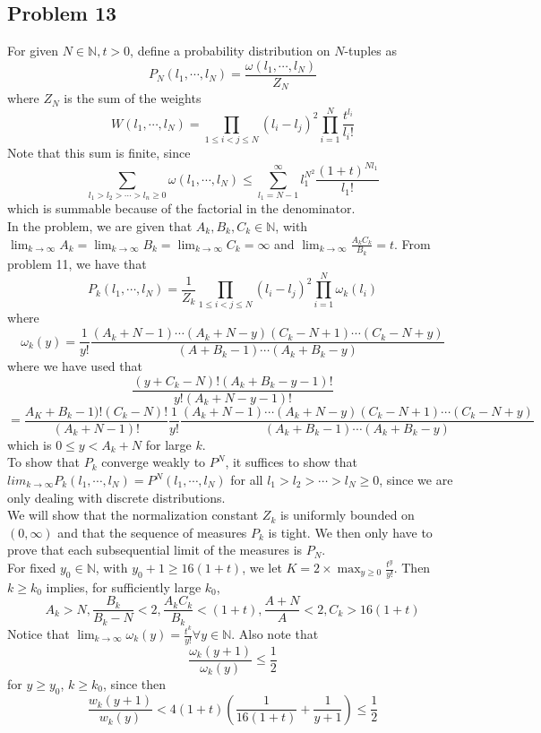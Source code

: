 \documentclass[12pt]{article}
\begin{document}
	
	\subsection*{Problem 13}

For given $N \in \mathbb{N}, t > 0$, define a probability distribution on $N$-tuples as
$$P_N(l_1, \cdots, l_N) = \frac{\omega(l_1, \cdots, l_N)}{Z_N}$$
where $Z_N$ is the sum of the weights
$$W(l_1, \cdots, l_N) = \prod_{1 \leq i < j \leq N} (l_i - l_j)^2 \prod_{i = 1}^N \frac{t^{l_i}}{l_i !}$$
Note that this sum is finite, since
$$\sum_{l_1 > l_2 > \cdots > l_n \geq 0} \omega(l_1, \cdots, l_N) \leq \sum_{l_1 = N-1}^\infty l_1^{N^2} \frac{(1 + t)^{Nl_1}}{l_1!}$$
which is summable because of the factorial in the denominator.\\

In the problem, we are given that $A_k, B_k, C_k \in \mathbb{N}$, with $\lim_{k \rightarrow \infty} A_k = \lim_{k \rightarrow \infty} B_k = \lim_{k \rightarrow \infty} C_k = \infty$ and $\lim_{k \rightarrow \infty} \frac{A_k C_k}{B_k} = t$. From problem 11, we have that
$$P_k(l_1, \cdots, l_N) = \frac{1}{Z_k} \prod_{1 \leq i < j \leq N} (l_i - l_j)^2 \prod_{i = 1}^N \omega_k(l_i)$$
where
$$\omega_k(y) = \frac{1}{y!}\frac{(A_k + N - 1) \cdots (A_k + N - y) (C_k - N + 1) \cdots (C_k - N + y)}{(A + B_k - 1) \cdots (A_k + B_k - y)}$$
where we have used that
$$\frac{(y + C_k - N) ! (A_k + B_k - y - 1)!}{y! (A_k + N - y - 1)!}$$
$$= \frac{A_K + B_k - 1)! (C_k - N)!}{(A_k + N - 1)!} \frac{1}{y!} \frac{(A_k + N - 1) \cdots (A_k + N - y) (C_k - N + 1) \cdots (C_k - N + y)}{(A_k + B_k - 1) \cdots (A_k + B_k - y)}$$
which is $0 \leq y < A_k + N$ for large $k$.\\

To show that $P_k$ converge weakly to $P^N$, it suffices to show that $lim_{k \rightarrow \infty} P_k(l_1, \cdots, l_N) = P^N(l_1, \cdots, l_N)$ for all $l_1 > l_2 > \cdots > l_N \geq 0$, since we are only dealing with discrete distributions.\\

We will show that the normalization constant $Z_k$ is uniformly bounded on $(0, \infty)$ and that the sequence of measures $P_k$ is tight. We then only have to prove that each subsequential limit of the measures is $P_N$. \\

For fixed $y_0 \in \mathbb{N}$, with $y_0 + 1 \geq 16(1 + t)$, we let $K = 2\times \max_{y \geq 0} \frac{t^y}{y!}$. Then $k \geq k_0$ implies, for sufficiently large $k_0$,
$$A_k > N, \frac{B_k}{B_k - N} < 2, \frac{A_k C_k}{B_k} < (1 + t), \frac{A+N}{A} < 2, C_k > 16(1 + t)$$
Notice that $\lim_{k \rightarrow \infty} \omega_k(y) = \frac{t^k}{y!} \forall y \in \mathbb{N}$. Also note that
$$\frac{\omega_k (y+1)}{\omega_k (y)} \leq \frac{1}{2}$$
for $y \geq y_0$, $k\geq k_0$, since then
$$\frac{w_k(y + 1)}{w_k(y)} < 4(1 + t) \left(\frac{1}{16(1+t)} + \frac{1}{y + 1} \right) \leq \frac{1}{2}$$\\
\end{document}

